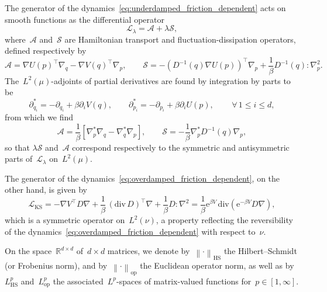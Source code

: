 \documentclass[10pt]{article}
\newcommand{\cL}{\mathcal{L}}
\newcommand{\e}{\mathrm{e}}
\newcommand{\R}{\mathbb{R}}
\newcommand{\cLham}{\mathcal A}
\newcommand{\cLou}{\mathcal S}
\newcommand{\cLod}{\cL_{\mathrm{KS}}}
\newcommand{\wLmu}{L^2(\mu)}
\newcommand{\1}{\mathbbm 1}
\begin{document}
The generator of the dynamics~\eqref{eq:underdamped_friction_dependent} acts on smooth functions as the differential operator
\begin{equation}
    \label{eq:generator}
    \cL_\lambda = \cLham + \lambda \cLou,
\end{equation}
where~$\cLham$ and~$\cLou$ are Hamiltonian transport and fluctuation-dissipation operators, defined respectively by
\begin{equation}
    \label{eq:generator_parts_tmp}
    \cLham = \nabla U(p)^\top\nabla_q - \nabla V(q)^\top\nabla_p,\qquad\cLou = -(D^{-1}(q)\nabla U(p))^\top\nabla_p + \frac1\beta D^{-1}(q):\nabla_p^2.
\end{equation}
The~$\wLmu$-adjoints of partial derivatives are found by integration by parts to be
\begin{equation}
    \label{eq:adjoints}
    \partial_{q_i}^* = -\partial_{q_i}+\beta\partial_{i}V(q),\qquad \partial_{p_i}^* = -\partial_{p_i}+\beta \partial_{i}U(p),\qquad\,\forall\, 1\leq i\leq d,
\end{equation}
from which we find
\begin{equation}
    \label{eq:generator_parts}
    \cLham = \frac1\beta\left[\nabla_p^{*}\nabla_q-\nabla_q^{*}\nabla_p\right],\qquad \cLou =-\frac1\beta \nabla_p^{*}D^{-1}(q)\nabla_p,
\end{equation}
so that $\lambda\cLou$ and~$\cLham$ correspond respectively to the symmetric and antisymmetric parts of~$\cL_\lambda$ on~$\wLmu$.

The generator of the dynamics~\eqref{eq:overdamped_friction_dependent}, on the other hand, is given by
\begin{equation}
    \cLod = -\nabla V^\top D\nabla + \frac1\beta\,\left(\mathrm{div}\, D\right)^\top \nabla + \frac1\beta D:\nabla^2 = \frac1\beta\e^{\beta V}\,\mathrm{div}\left(\e^{-\beta V}D\nabla\right),
\end{equation}
which is a symmetric operator on~$L^2(\nu)$, a property reflecting the reversibility of the dynamics~\eqref{eq:overdamped_friction_dependent} with respect to~$\nu$.

On the space~$\R^{d\times d}$ of~$d\times d$ matrices, we denote by~$\left\|\cdot\right\|_{\mathrm{HS}}$ the Hilbert--Schmidt (or Frobenius norm), and by~$\left\|\cdot\right\|_{\mathrm{op}}$ the Euclidean operator norm, as well as by~$L^p_{\mathrm{HS}}$ and~$L^p_{\mathrm{op}}$ the associated~$L^p$-spaces of matrix-valued functions for~$p\in [1,\infty]$.
\end{document}

